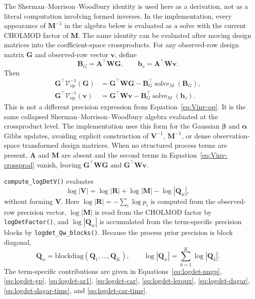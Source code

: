 \documentclass[11pt]{article}
\newcommand{\balpha}{\bm{\alpha}}
\newcommand{\bbeta}{\bm{\beta}}
\newcommand{\bv}{\bm{v}}
\newcommand{\bb}{\bm{b}}
\newcommand{\bA}{\bm{A}}
\newcommand{\bB}{\bm{B}}
\newcommand{\bG}{\bm{G}}
\newcommand{\bM}{\bm{M}}
\newcommand{\bQ}{\bm{Q}}
\newcommand{\bR}{\bm{R}}
\newcommand{\bV}{\bm{V}}
\newcommand{\bW}{\bm{W}}
\newcommand{\trans}{^\top}
\begin{document}
The Sherman--Morrison--Woodbury identity is used here as a derivation, not as
a literal computation involving formed inverses. In the implementation, every
appearance of $\bM^{-1}$ in the algebra below is evaluated as a solve with the
current CHOLMOD factor of $\bM$. The same identity can be evaluated after
moving design matrices into the coefficient-space crossproducts. For any
observed-row design matrix $\bG$ and observed-row vector $\bv$, define
\begin{equation}
  \bB_G = \bA\trans\bW\bG,
  \qquad
  \bb_v = \bA\trans\bW\bv .
\end{equation}
Then
\begin{equation}
\label{eq:Vinv-crossprod}
\begin{aligned}
  \bG\trans \mathcal{V}^{-1}_{\mathrm{op}}(\bG)
    &= \bG\trans\bW\bG -
       \bB_G\trans \operatorname{solve}_M(\bB_G),\\
  \bG\trans \mathcal{V}^{-1}_{\mathrm{op}}(\bv)
    &= \bG\trans\bW\bv -
       \bB_G\trans \operatorname{solve}_M(\bb_v).
\end{aligned}
\end{equation}
This is not a different precision expression from
Equation~\eqref{eq:Vinv-op}. It is the same collapsed
Sherman--Morrison--Woodbury algebra evaluated at the crossproduct level. The
implementation uses this form for the Gaussian $\bbeta$ and $\balpha$ Gibbs
updates, avoiding explicit construction of $\bV^{-1}$, $\bM^{-1}$, or dense
observation-space transformed design matrices.
When no structured process terms are present, $\bA$ and $\bM$ are absent and
the second terms in Equation~\eqref{eq:Vinv-crossprod} vanish, leaving
$\bG\trans\bW\bG$ and $\bG\trans\bW\bv$.

\texttt{compute\_logDetV()} evaluates
\begin{equation}
  \label{eq:logdet-V}
  \log|\bV| = \log|\bR| + \log|\bM| - \log|\bQ_w|,
\end{equation}
without forming $\bV$. Here $\log|\bR|=-\sum_i \log p_i$ is computed from the observed-row precision vector, $\log|\bM|$ is read from the CHOLMOD factor by \texttt{logDetFactor()}, and $\log|\bQ_w|$ is accumulated from the term-specific precision blocks by \texttt{logdet\_Qw\_blocks()}.
Because the process prior precision is block diagonal,
\begin{equation}
  \label{eq:Qw-blockdiag}
  \bQ_w=\mathrm{blockdiag}(\bQ_1,\ldots,\bQ_K),
  \qquad
  \log|\bQ_w|=\sum_{k=1}^K\log|\bQ_k|.
\end{equation}
The term-specific contributions are given in Equations~\eqref{eq:logdet-nngp}, \eqref{eq:logdet-gp}, \eqref{eq:logdet-ar1}, \eqref{eq:logdet-car}, \eqref{eq:logdet-leroux}, \eqref{eq:logdet-dagar}, \eqref{eq:logdet-dagar-time}, and \eqref{eq:logdet-car-time}.
\end{document}
